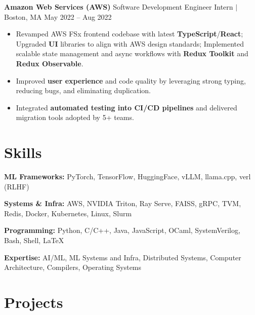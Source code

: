 \documentclass[letterpaper,10pt]{article}
\newcommand{\experienceBulletListStart}{\begin{itemize}[leftmargin=0.3in, label=$\bullet$, topsep=2pt, itemsep=0.2em, parsep=0pt]}
\newcommand{\experienceBulletListEnd}{\end{itemize}\vspace{4pt}}
\begin{document}
\vspace{2pt}
\textbf{Amazon Web Services (AWS)} \hspace{0.5em} \normalsize{Software Development Engineer Intern $|$ Boston, MA} \hfill May 2022 -- Aug 2022 \\

\experienceBulletListStart
  \item\normalsize{Revamped AWS FSx frontend codebase with latest \textbf{TypeScript}/\textbf{React}; Upgraded \textbf{UI} libraries to align with AWS design standards; 
  Implemented scalable state management and async workflows with \textbf{Redux Toolkit} and \textbf{Redux Observable}.}
  \item\normalsize{Improved \textbf{user experience} and code quality by leveraging strong typing, reducing bugs, and eliminating duplication.}
  \item\normalsize{Integrated \textbf{automated testing into CI/CD pipelines} and delivered migration tools adopted by 5+ teams.}
\experienceBulletListEnd


\section{Skills}

\textbf{ML Frameworks:} PyTorch, TensorFlow, HuggingFace, vLLM, llama.cpp, verl (RLHF) \\
\vspace{2pt}

\textbf{Systems \& Infra:} AWS, NVIDIA Triton, Ray Serve, FAISS, gRPC, TVM, Redis, Docker, Kubernetes, Linux, Slurm \\
\vspace{2pt}

\textbf{Programming:} Python, C/C++, Java, JavaScript, OCaml, SystemVerilog, Bash, Shell, \LaTeX \\
\vspace{2pt}

\textbf{Expertise:} AI/ML, ML Systems and Infra, Distributed Systems, Computer Architecture, Compilers, Operating Systems

\vspace{4pt}

\section{Projects}
\vspace{2pt}
\end{document}
